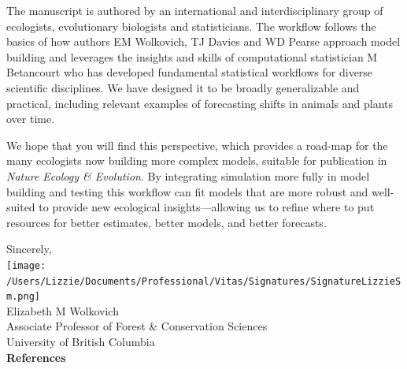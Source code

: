 \documentclass[11pt]{article}
\begin{document}

The manuscript is authored by an international and interdisciplinary group of ecologists, evolutionary biologists and statisticians. The workflow follows the basics of how authors EM Wolkovich, TJ Davies and WD Pearse approach model building and leverages the insights and skills of computational statistician M Betancourt who has developed fundamental statistical workflows for diverse scientific disciplines. We have designed it to be broadly generalizable and practical, including relevant examples of forecasting shifts in animals and plants over time.

We hope that you will find this perspective, which provides a road-map for the many ecologists now building more complex models, suitable for publication in \emph{Nature Ecology \& Evolution}. By integrating simulation more fully in model building and testing this workflow can fit models that are more robust and well-suited to provide new ecological insights---allowing us to refine where to put resources for better estimates, better models, and better forecasts. %

Sincerely,\\

\texttt{[image: /Users/Lizzie/Documents/Professional/Vitas/Signatures/SignatureLizzieSm.png]} \\

Elizabeth M Wolkovich\\
Associate Professor of Forest \& Conservation Sciences\\ 
University of British Columbia\\

{\bf References}
\vspace{-8ex}

\end{document}
